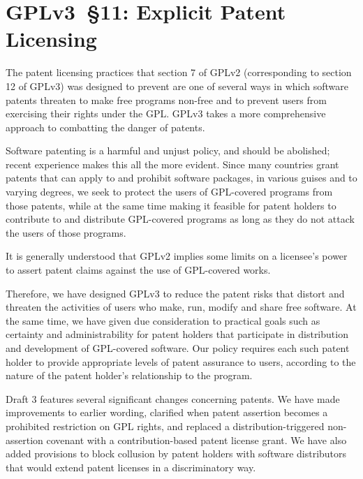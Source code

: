 \section{GPLv3~\S11: Explicit Patent Licensing}
\label{GPLv3s11}

The patent licensing practices that section 7 of GPLv2 (corresponding to
section 12 of GPLv3) was designed to prevent are one of several ways in which
software patents threaten to make free programs non-free and to prevent users
from exercising their rights under the GPL. GPLv3 takes a more comprehensive
approach to combatting the danger of patents.

Software patenting is a harmful and unjust policy, and should be abolished;
recent experience makes this all the more evident. Since many countries grant
patents that can apply to and prohibit software packages, in various guises
and to varying degrees, we seek to protect the users of GPL-covered programs
from those patents, while at the same time making it feasible for patent
holders to contribute to and distribute GPL-covered programs as long as they
do not attack the users of those programs.

It is generally understood that GPLv2 implies some limits on a licensee's
power to assert patent claims against the use of GPL-covered works.

Therefore, we have designed GPLv3 to reduce the patent risks that distort and
threaten the activities of users who make, run, modify and share free
software.  At the same time, we have given due consideration to practical
goals such as certainty and administrability for patent holders that
participate in distribution and development of GPL-covered software.  Our
policy requires each such patent holder to provide appropriate levels of
patent assurance to users, according to the nature of the patent holder's
relationship to the program.

Draft 3 features several significant changes concerning patents.  We have
made improvements to earlier wording, clarified when patent assertion becomes
a prohibited restriction on GPL rights, and replaced a distribution-triggered
non-assertion covenant with a contribution-based patent license grant. We
have also added provisions to block collusion by patent holders with software
distributors that would extend patent licenses in a discriminatory way.


